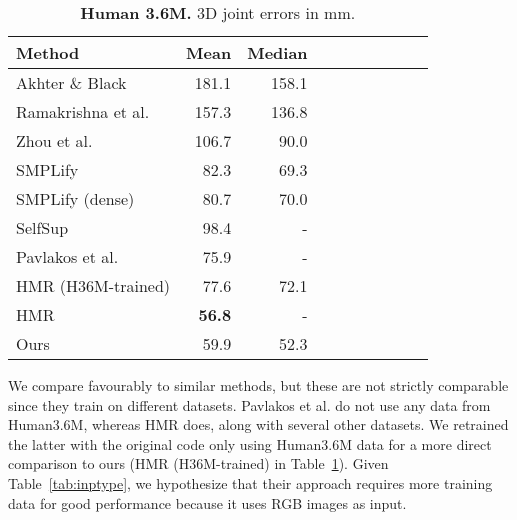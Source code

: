 \documentclass[10pt,twocolumn,letterpaper]{article}
\begin{document}
\begin{table}
\begin{tabular}{lrrrrrrrrr}
\hline
 Method & \multicolumn{1}{c}{Mean}      & \multicolumn{1}{l}{Median} \\ \hline
 Akhter \& Black \cite{akhter_pose_conditioned_cvpr15}        & 181.1                         & 158.1               \\
 Ramakrishna et al. \cite{ramakrishna2012reconstructing}      & 157.3                         & 136.8               \\
 Zhou et al. \cite{zhou_convexrelaxation_cvpr2015}            & 106.7                         &  90.0               \\
 SMPLify         \cite{bogo_smpl_eccv16}                      &  82.3                         &  69.3               \\
 SMPLify (dense) \cite{Lassner:UP:2017}                       &  80.7                         &  70.0               \\ \hline
 SelfSup \cite{tung2017self}                                  &  98.4                         &    -                \\
 Pavlakos et al. \cite{pavlakos2018humanshape}                &  75.9                         &    -                \\
 HMR (H36M-trained)\cite{hmrKanazawa17}                       &  77.6                         &  72.1               \\
 HMR               \cite{hmrKanazawa17}                       &  \bf{56.8}                    &    -                \\
 Ours                                                         &  59.9                         &  52.3               \\ \hline
 \end{tabular}
\caption{{\bf Human 3.6M.} {3D joint errors in mm}.
 }
 \label{table:H36}
 \end{table}

We compare favourably to similar methods, but these are not strictly 
comparable since they train on different datasets. Pavlakos et al. \cite{pavlakos2018humanshape} 
do not use any data from Human3.6M, whereas HMR \cite{hmrKanazawa17} does, along with several other datasets.
We retrained the latter with the original code only using Human3.6M data for a more direct comparison to ours (HMR (H36M-trained) in Table~\ref{table:H36}). 
Given Table~\ref{tab:inptype}, we hypothesize that their approach 
requires more training data for good performance because it uses RGB images as input.
\end{document}
